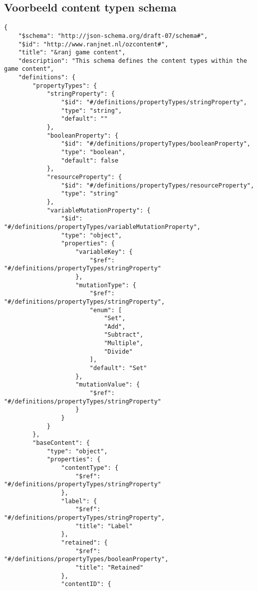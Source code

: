 \begin{appendices}
    \chapter{Voorbeeld content typen schema}
    \lstset{language=JSON}
    \begin{lstlisting}
{
    "$schema": "http://json-schema.org/draft-07/schema#",
    "$id": "http://www.ranjnet.nl/ozcontent#",
    "title": "&ranj game content",
    "description": "This schema defines the content types within the game content",
    "definitions": {
        "propertyTypes": {
            "stringProperty": {
                "$id": "#/definitions/propertyTypes/stringProperty",
                "type": "string",
                "default": ""
            },
            "booleanProperty": {
                "$id": "#/definitions/propertyTypes/booleanProperty",
                "type": "boolean",
                "default": false
            },
            "resourceProperty": {
                "$id": "#/definitions/propertyTypes/resourceProperty",
                "type": "string"
            },
            "variableMutationProperty": {
                "$id": "#/definitions/propertyTypes/variableMutationProperty",
                "type": "object",
                "properties": {
                    "variableKey": {
                        "$ref": "#/definitions/propertyTypes/stringProperty"
                    },
                    "mutationType": {
                        "$ref": "#/definitions/propertyTypes/stringProperty",
                        "enum": [
                            "Set",
                            "Add",
                            "Subtract",
                            "Multiple",
                            "Divide"
                        ],
                        "default": "Set"
                    },
                    "mutationValue": {
                        "$ref": "#/definitions/propertyTypes/stringProperty"
                    }
                }
            }
        },
        "baseContent": {
            "type": "object",
            "properties": {
                "contentType": {
                    "$ref": "#/definitions/propertyTypes/stringProperty"
                },
                "label": {
                    "$ref": "#/definitions/propertyTypes/stringProperty",
                    "title": "Label"
                },
                "retained": {
                    "$ref": "#/definitions/propertyTypes/booleanProperty",
                    "title": "Retained"
                },
                "contentID": {

\end{lstlisting}
\end{appendices}

